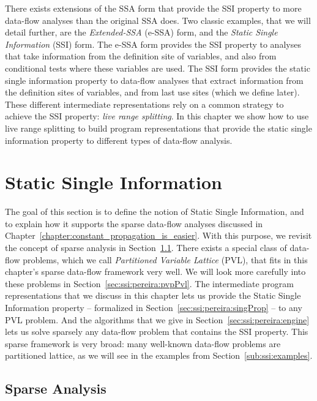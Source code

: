 There exists extensions of the SSA form that provide the SSI property to more
data-flow analyses than the original SSA does.
Two classic examples, that we will detail further, are the {\em Extended-SSA} (e-SSA) form, and the {\em Static Single Information} (SSI) form.
The e-SSA form provides the SSI property to analyses that take information from
the definition site of variables, and also from conditional tests where these
variables are used.
The SSI form provides the static single information property to data-flow
analyses that extract information from the definition sites of variables, and from last use sites (which we define later).
These different intermediate representations rely on a common strategy to achieve the SSI property: {\em live range splitting}.
In this chapter we show how to use live range splitting to build program
representations that provide the static single information property to different
types of data-flow analysis.

\section{Static Single Information}
\label{sec:ssi:pereira:single}

The goal of this section is to define the notion of Static Single Information, and to explain how it supports the sparse data-flow analyses discussed in Chapter~\ref{chapter:constant_propagation_is_easier}.
With this purpose, we revisit the concept of sparse analysis in Section~\ref{sec:ssi:pereira:sparse}.
There exists a special class of data-flow problems, which we call {\em Partitioned Variable Lattice} (PVL), that fits in this chapter's sparse data-flow framework very well.
We will look more carefully into these problems in Section~\ref{sec:ssi:pereira:pvpPvl}.
The intermediate program representations that we discuss in this chapter lets us provide the Static Single Information property -- formalized in Section~\ref{sec:ssi:pereira:singProp} -- to any PVL problem.
And the algorithms that we give in Section~\ref{sec:ssi:pereira:engine} lets us solve sparsely any data-flow problem that contains the SSI property.
This sparse framework is very broad: many well-known data-flow problems are partitioned lattice, as we will see in the examples from Section~\ref{sub:ssi:examples}.


\subsection{Sparse Analysis}
\label{sec:ssi:pereira:sparse}

